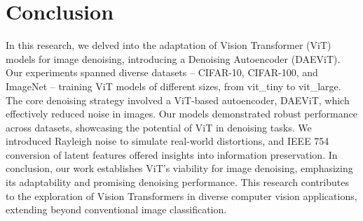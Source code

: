 \documentclass[10pt,twocolumn]{IEEEtran}
\begin{document}
\section{Conclusion}
In this research, we delved into the adaptation of Vision Transformer (ViT) models for image denoising, introducing a Denoising Autoencoder (DAEViT). Our experiments spanned diverse datasets – CIFAR-10, CIFAR-100, and ImageNet – training ViT models of different sizes, from vit\_tiny to vit\_large. The core denoising strategy involved a ViT-based autoencoder, DAEViT, which effectively reduced noise in images. Our models demonstrated robust performance across datasets, showcasing the potential of ViT in denoising tasks. We introduced Rayleigh noise to simulate real-world distortions, and IEEE 754 conversion of latent features offered insights into information preservation. In conclusion, our work establishes ViT's viability for image denoising, emphasizing its adaptability and promising denoising performance. This research contributes to the exploration of Vision Transformers in diverse computer vision applications, extending beyond conventional image classification.



\end{document}
